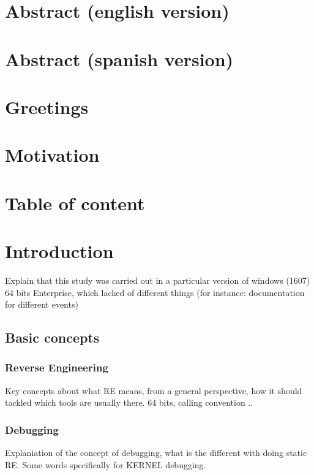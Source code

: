 \documentclass[11pt,a4paper,twoside]{tesis}
\begin{document}

\def\autor{Pablo Agustín Artuso \\ LU: 282/11 \\ artusopablo@gmail.com}
\def\tituloTesis{Analyzing Windows Telemetry component}
\def\runtitulo{Analyzing Windows Telemetry component}
\def\runtitle{}
\def\director{Rodolfo Baader $<$rbaader@dc.uba.ar$>$}
\def\codirector{Aleksandar Milenkoski $<$amilenkoski@ernw.de$>$}
\def\lugar{Buenos Aires, 2018}


\section*{Abstract (english version)}
\section*{Abstract (spanish version)}
\section*{Greetings}
\section*{Motivation}

\section*{Table of content}

\section*{Introduction}
Explain that this study was carried out in a particular version of windows (1607) 64 bits Enterprise, which lacked of different things (for instance: documentation for different events)
\subsection*{Basic concepts}
\subsubsection*{Reverse Engineering}
Key concepts about what RE means, from a general perspective, how it should tackled which tools are usually there.  64 bits, calling convention .. 
\subsubsection*{Debugging}
Explaniation of the concept of debugging, what is the different with doing static RE. Some words specifically for KERNEL debugging. 
\end{document}
